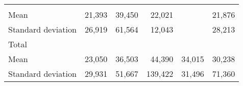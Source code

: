 \begin{tabular}{llllll}
  \multicolumn{1}{r}{} &
  \multicolumn{1}{r}{} &
  \multicolumn{1}{r}{} &
  \multicolumn{1}{r}{} \\
\multicolumn{1}{l}{\hspace{4em}Mean} &
  \multicolumn{1}{|r}{21,393} &
  \multicolumn{1}{r}{39,450} &
  \multicolumn{1}{r}{22,021} &
  \multicolumn{1}{r}{} &
  \multicolumn{1}{r}{21,876} \\
\multicolumn{1}{l}{\hspace{4em}Standard deviation} &
  \multicolumn{1}{|r}{26,919} &
  \multicolumn{1}{r}{61,564} &
  \multicolumn{1}{r}{12,043} &
  \multicolumn{1}{r}{} &
  \multicolumn{1}{r}{28,213} \\
\multicolumn{1}{l}{\hspace{3em}Total} &
  \multicolumn{1}{|r}{} &
  \multicolumn{1}{r}{} &
  \multicolumn{1}{r}{} &
  \multicolumn{1}{r}{} &
  \multicolumn{1}{r}{} \\
\multicolumn{1}{l}{\hspace{4em}Mean} &
  \multicolumn{1}{|r}{23,050} &
  \multicolumn{1}{r}{36,503} &
  \multicolumn{1}{r}{44,390} &
  \multicolumn{1}{r}{34,015} &
  \multicolumn{1}{r}{30,238} \\
\multicolumn{1}{l}{\hspace{4em}Standard deviation} &
  \multicolumn{1}{|r}{29,931} &
  \multicolumn{1}{r}{51,667} &
  \multicolumn{1}{r}{139,422} &
  \multicolumn{1}{r}{31,496} &
  \multicolumn{1}{r}{71,360} \\
\cline{1-6}
\end{tabular}

